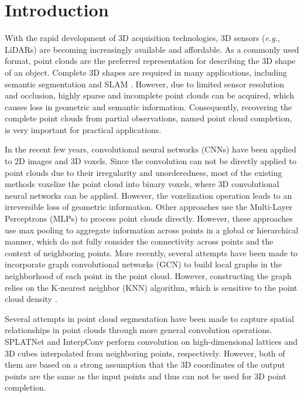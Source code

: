 \documentclass[runningheads]{llncs}
\begin{document}
\section{Introduction}

With the rapid development of 3D acquisition technologies, 3D sensors ({\it e.g.}, LiDARs) are becoming increasingly available and affordable.
As a commonly used format, point clouds are the preferred representation for describing the 3D shape of an object.
Complete 3D shapes are required in many applications, including semantic segmentation and SLAM \cite{DBLP:journals/trob/CadenaCCLSN0L16}.
However, due to limited sensor resolution and occlusion, highly sparse  and incomplete point clouds can be acquired, which causes loss in geometric and semantic information.
Consequently, recovering the complete point clouds from partial observations, named point cloud completion, is very important for practical applications.

In the recent few years, convolutional neural networks (CNNs) have been applied to 2D images and 3D voxels.
Since the convolution can not be directly applied to point clouds due to their irregularity and unorderedness, most of the existing methods \cite{DBLP:conf/cvpr/DaiQN17,DBLP:conf/iccv/HanLHKY17,DBLP:conf/eccv/SharmaGF16,DBLP:conf/cvpr/StutzG18,DBLP:conf/cvpr/NguyenHTPY16,DBLP:conf/iros/VarleyDRRA17,DBLP:conf/nips/LiuTLH19} voxelize the point cloud into binary voxels, where 3D convolutional neural networks can be applied.
However, the voxelization operation leads to an irreversible loss of geometric information.
Other approaches \cite{DBLP:conf/ThreeDim/YuanKHMH18,DBLP:conf/wacv/MandikalR19,DBLP:conf/cvpr/TchapmiKR0S19} use the Multi-Layer Perceptrons (MLPs) to process point clouds directly.
However, these approaches use max pooling to aggregate information across points in a global or hierarchical manner, which do not fully consider the connectivity across points and the context of neighboring points.
More recently, several attempts \cite{DBLP:journals/tog/WangSLSBS19,DBLP:conf/ijcai/Wang0J19} have been made to incorporate graph convolutional networks (GCN) \cite{DBLP:conf/iclr/KipfW17} to build local graphs in the neighborhood of each point in the point cloud.
However, constructing the graph relies on the K-nearest neighbor (KNN) algorithm, which is sensitive to the point cloud density \cite{DBLP:conf/iccv/ThomasQDMGG19}.

Several attempts in point cloud segmentation have been made to capture spatial relationships in point clouds through more general convolution operations.
SPLATNet \cite{DBLP:conf/cvpr/SuJSMK0K18} and InterpConv \cite{DBLP:conf/iccv/MaoWL19} perform convolution on high-dimensional lattices and 3D cubes interpolated from neighboring points, respectively.
However, both of them are based on a strong assumption that the 3D coordinates of the output points are the same as the input points and thus can not be used for 3D point completion.
\end{document}
